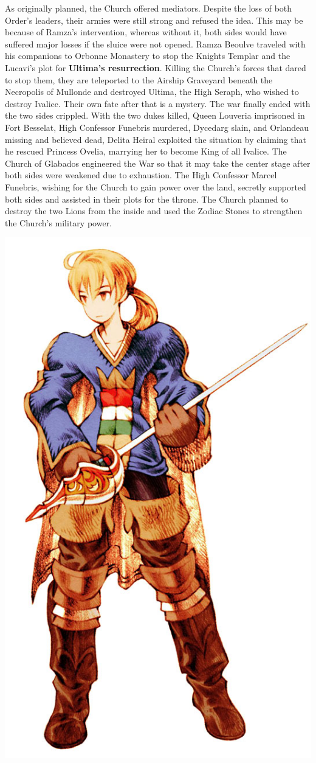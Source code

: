 As originally planned, the Church offered mediators. 
Despite the loss of both Order's leaders, their armies were still strong and refused the idea. 
This may be because of Ramza's intervention, whereas without it, both sides would have suffered major losses if the sluice were not opened.
Ramza Beoulve traveled with his companions to Orbonne Monastery to stop the Knights Templar and the Lucavi's plot for \textbf{Ultima's resurrection}. 
Killing the Church's forces that dared to stop them, they are teleported to the Airship Graveyard beneath the Necropolis of Mullonde and destroyed Ultima, the High Seraph, who wished to destroy Ivalice. 
Their own fate after that is a mystery.
The war finally ended with the two sides crippled. 
With the two dukes killed, Queen Louveria imprisoned in Fort Besselat, High Confessor Funebris murdered, Dycedarg slain, and Orlandeau missing and believed dead, Delita Heiral exploited the situation by claiming that he rescued Princess Ovelia, marrying her to become King of all Ivalice.
The Church of Glabados engineered the War so that it may take the center stage after both sides were weakened due to exhaustion. 
The High Confessor Marcel Funebris, wishing for the Church to gain power over the land, secretly supported both sides and assisted in their plots for the throne. 
The Church planned to destroy the two Lions from the inside and used the Zodiac Stones to strengthen the Church's military power.
%
\begin{center}
\includegraphics[width=0.85\columnwidth]{./art/images/ramza.jpg}
\end{center}
